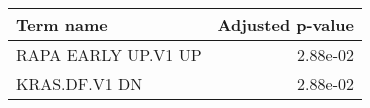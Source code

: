 \begin{tabular}{lr}
\toprule
           Term name &  Adjusted p-value \\
\midrule
 RAPA EARLY UP.V1 UP &          2.88e-02 \\
       KRAS.DF.V1 DN &          2.88e-02 \\
\bottomrule
\end{tabular}
